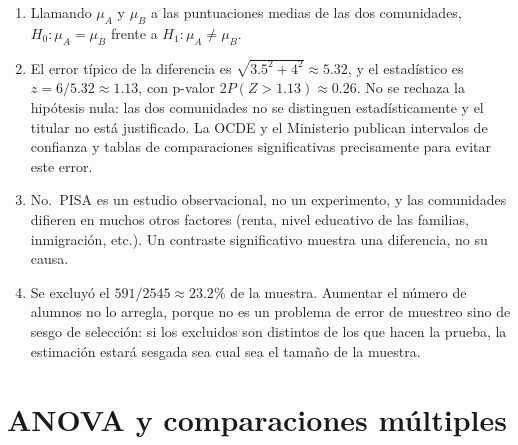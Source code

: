 \documentclass[
  spanish,
  a4paper,
]{scrreport}
\theoremstyle{definition}
\theoremstyle{remark}
\begin{document}
\begin{tcolorbox}[enhanced jigsaw, arc=.35mm, bottomrule=.15mm, bottomtitle=1mm, breakable, colback=white, colbacktitle=quarto-callout-tip-color!10!white, colframe=quarto-callout-tip-color-frame, coltitle=black, left=2mm, leftrule=.75mm, opacityback=0, opacitybacktitle=0.6, rightrule=.15mm, title=\textcolor{quarto-callout-tip-color}{\faLightbulb}\hspace{0.5em}{Solución}, titlerule=0mm, toprule=.15mm, toptitle=1mm]

\begin{enumerate}
\def\labelenumi{\alph{enumi}.}
\item
  Llamando \(\mu_A\) y \(\mu_B\) a las puntuaciones medias de las dos
  comunidades, \(H_0: \mu_A=\mu_B\) frente a \(H_1: \mu_A\neq\mu_B\).
\item
  El error típico de la diferencia es \(\sqrt{3.5^2+4^2}\approx 5.32\),
  y el estadístico es \(z=6/5.32\approx 1.13\), con p-valor
  \(2P(Z>1.13)\approx 0.26\). No se rechaza la hipótesis nula: las dos
  comunidades no se distinguen estadísticamente y el titular no está
  justificado. La OCDE y el Ministerio publican intervalos de confianza
  y tablas de comparaciones significativas precisamente para evitar este
  error.
\item
  No.~PISA es un estudio observacional, no un experimento, y las
  comunidades difieren en muchos otros factores (renta, nivel educativo
  de las familias, inmigración, etc.). Un contraste significativo
  muestra una diferencia, no su causa.
\item
  Se excluyó el \(591/2545\approx 23.2\)\% de la muestra. Aumentar el
  número de alumnos no lo arregla, porque no es un problema de error de
  muestreo sino de sesgo de selección: si los excluidos son distintos de
  los que hacen la prueba, la estimación estará sesgada sea cual sea el
  tamaño de la muestra.
\end{enumerate}

\end{tcolorbox}

\section{ANOVA y comparaciones
múltiples}\label{anova-y-comparaciones-muxfaltiples}
\end{document}
